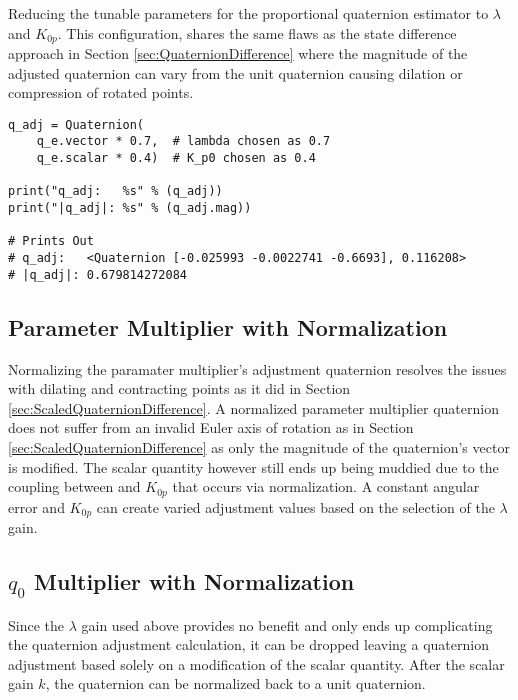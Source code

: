 Reducing the tunable parameters for the proportional quaternion estimator to $\lambda$ and $K_{0p}$.  This configuration, shares the same flaws as the state difference approach in Section \ref{sec:QuaternionDifference} where the magnitude of the adjusted quaternion can vary from the unit quaternion causing dilation or compression of rotated points.

\begin{singlespace}
  \begin{verbatim}
q_adj = Quaternion(
    q_e.vector * 0.7,  # lambda chosen as 0.7
    q_e.scalar * 0.4)  # K_p0 chosen as 0.4

print("q_adj:   %s" % (q_adj))
print("|q_adj|: %s" % (q_adj.mag))

# Prints Out
# q_adj:   <Quaternion [-0.025993 -0.0022741 -0.6693], 0.116208>
# |q_adj|: 0.679814272084
  \end{verbatim}
\nocite{minted}
\end{singlespace}


\subsection{Parameter Multiplier with Normalization}
\label{subsec:ParameterMultiplierwithNormalization}

Normalizing the paramater multiplier's adjustment quaternion resolves the issues with dilating and contracting points as it did in Section \ref{sec:ScaledQuaternionDifference}.  A normalized parameter multiplier quaternion does not suffer from an invalid Euler axis of rotation as in Section \ref{sec:ScaledQuaternionDifference} as only the magnitude of the quaternion's vector is modified.  The scalar quantity however still ends up being muddied due to the coupling between  and $K_{0p}$ that occurs via normalization.  A constant angular error and $K_{0p}$ can create varied adjustment values based on the selection of the $\lambda$ gain.

\subsection{$q_0$ Multiplier with Normalization}
\label{subsec:q0MultiplierWithNormalization}

Since the $\lambda$ gain used above provides no benefit and only ends up complicating the quaternion adjustment calculation, it can be dropped leaving a quaternion adjustment based solely on a modification of the scalar quantity.  After the scalar gain $k$, the quaternion can be normalized back to a unit quaternion.

